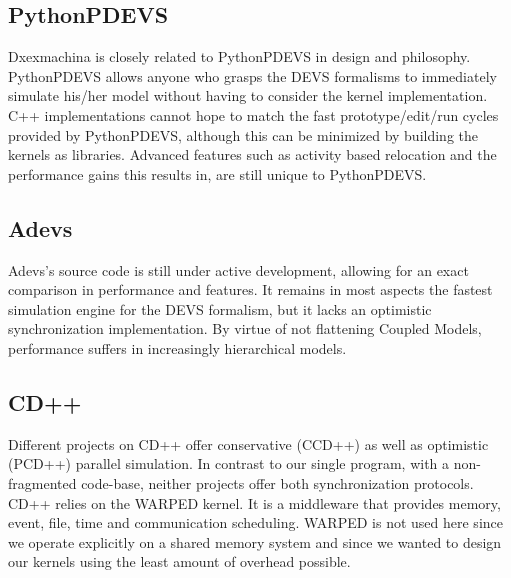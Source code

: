 \subsection{PythonPDEVS}
Dxexmachina is closely related to PythonPDEVS in design and philosophy. PythonPDEVS allows anyone who grasps the DEVS formalisms to immediately simulate his/her model without having to consider the kernel implementation. C++ implementations cannot hope to match the fast prototype/edit/run cycles provided by PythonPDEVS, although this can be minimized by building the kernels as libraries. %
Advanced features such as activity based relocation and the performance gains this results in, are still unique to PythonPDEVS.
\subsection{Adevs}
Adevs's source code is still under active development, allowing for an exact comparison in performance and features. It remains in most aspects the fastest simulation engine for the DEVS formalism, but it lacks an optimistic synchronization implementation. %
By virtue of not flattening Coupled Models, performance suffers in increasingly hierarchical models.
\subsection{CD++}
Different projects on CD++ offer conservative (CCD++) as well as optimistic (PCD++) parallel simulation. In contrast to our single program, with a non-fragmented code-base, neither projects offer both synchronization protocols. CD++ relies on the WARPED kernel. It is a middleware that provides memory, event, file, time and communication scheduling. WARPED is not used here since we operate explicitly on a shared memory system and since we wanted to design our kernels using the least amount of overhead possible.
